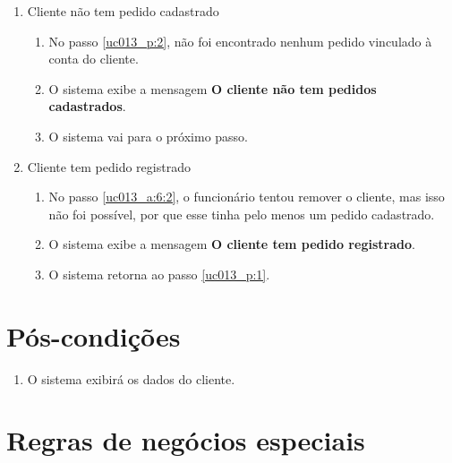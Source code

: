 \begin{enumerate}[label=E\arabic*]
	\item Cliente não tem pedido cadastrado \label{uc013_e:1}
	\begin{enumerate}[label*=.\arabic*]
		\item[] No passo \ref{uc013_p:2}, não foi encontrado nenhum pedido vinculado à conta do cliente.
		\item O sistema exibe a mensagem \textbf{O cliente não tem pedidos cadastrados}.
		\item O sistema vai para o próximo passo.
	\end{enumerate}

	\item Cliente tem pedido registrado \label{uc013_e:2}
	\begin{enumerate}[label*=.\arabic*]
		\item[] No passo \ref{uc013_a:6:2}, o funcionário tentou remover o cliente, mas isso não foi possível, por que esse tinha pelo menos um pedido cadastrado.
		\item O sistema exibe a mensagem \textbf{O cliente tem pedido registrado}.
		\item O sistema retorna ao passo \ref{uc013_p:1}.
	\end{enumerate}
\end{enumerate}

\section{Pós-condições}

\begin{enumerate}
	\item O sistema exibirá os dados do cliente.	
\end{enumerate}

\section{Regras de negócios especiais}


